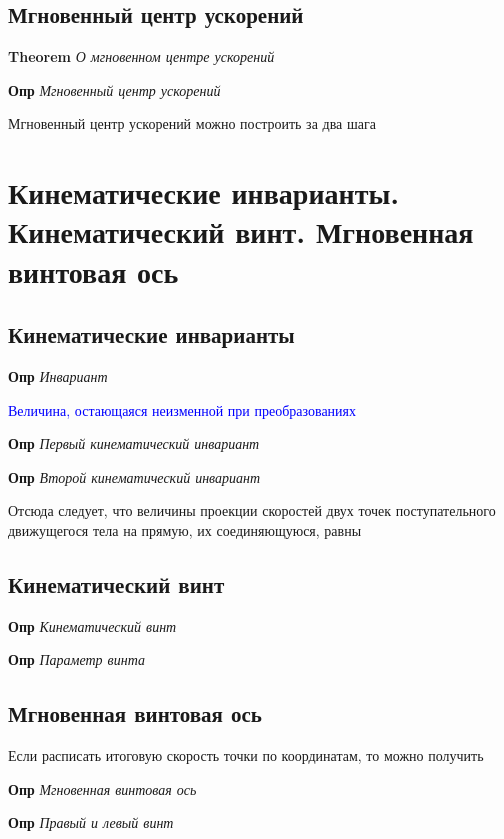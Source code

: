 \documentclass[a4paper, 14pt]{article}
\begin{document}
    \subsection{Мгновенный центр ускорений}
    
    \textbf{Theorem} \textit{О мгновенном центре ускорений}
    
    \textbf{Опр} \textit{Мгновенный центр ускорений}
    
    Мгновенный центр ускорений можно построить за два шага
    
    \section{Кинематические инварианты.
    Кинематический винт.
    Мгновенная винтовая ось}
    
    \subsection{Кинематические инварианты}
    
    \textbf{Опр} \textit{Инвариант}
    
    \textcolor{blue}{Величина, остающаяся неизменной при преобразованиях}
    
    \textbf{Опр} \textit{Первый кинематический инвариант}
    
    \textbf{Опр} \textit{Второй кинематический инвариант}
    
    Отсюда следует, что величины проекции скоростей двух точек поступательного движущегося тела на прямую, их
    соединяющуюся, равны
    
    \subsection{Кинематический винт}
    
    \textbf{Опр} \textit{Кинематический винт}
    
    \textbf{Опр} \textit{Параметр винта}
    
    \subsection{Мгновенная винтовая ось}
    
    Если расписать итоговую скорость точки по координатам, то можно получить
    
    \textbf{Опр} \textit{Мгновенная винтовая ось}
    
    \textbf{Опр} \textit{Правый и левый винт}
    
\end{document}
